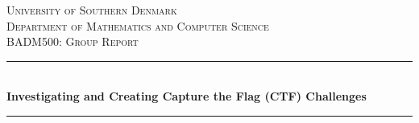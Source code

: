 \thispagestyle{empty}

\begin{titlepage}

\newcommand{\HRule}{\rule{\linewidth}{0.5mm}}

\center %


	\textsc{\LARGE University of Southern Denmark}\\[1.5cm]

	\textsc{\Large Department of Mathematics and Computer Science}\\[0.5cm]

	\textsc{\large BADM500: Group Report}\\[0.5cm]


	\HRule\\[0.7cm]

        {\huge\bfseries Investigating and Creating Capture the Flag (CTF) Challenges}\\[0.4cm]



	\HRule\\[1.0cm]


\end{titlepage}
